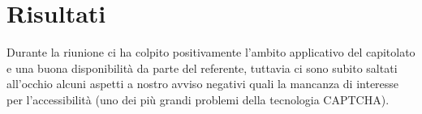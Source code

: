 \section{Risultati}
Durante la riunione ci ha colpito positivamente l'ambito applicativo del capitolato e una buona disponibilità da parte del referente, tuttavia ci sono subito saltati all'occhio alcuni aspetti a nostro avviso negativi quali la mancanza di interesse per l'accessibilità (uno dei più grandi problemi della tecnologia CAPTCHA).